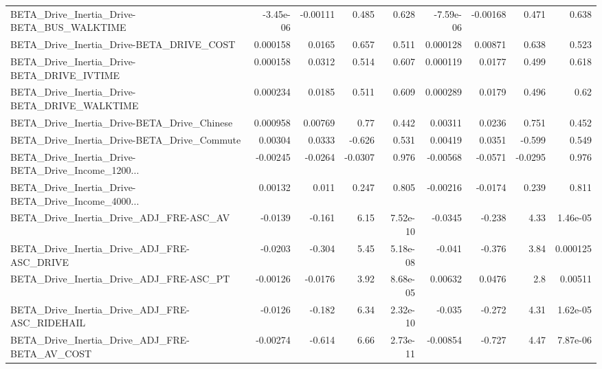 \begin{tabular}{lrrrrrrrr}
BETA\_Drive\_Inertia\_Drive-BETA\_BUS\_WALKTIME         &   -3.45e-06 &     -0.00111 &    0.485 &    0.628 &  -7.59e-06 &    -0.00168 &        0.471 &         0.638 \\
BETA\_Drive\_Inertia\_Drive-BETA\_DRIVE\_COST           &    0.000158 &       0.0165 &    0.657 &    0.511 &   0.000128 &     0.00871 &        0.638 &         0.523 \\
BETA\_Drive\_Inertia\_Drive-BETA\_DRIVE\_IVTIME         &    0.000158 &       0.0312 &    0.514 &    0.607 &   0.000119 &      0.0177 &        0.499 &         0.618 \\
BETA\_Drive\_Inertia\_Drive-BETA\_DRIVE\_WALKTIME       &    0.000234 &       0.0185 &    0.511 &    0.609 &   0.000289 &      0.0179 &        0.496 &          0.62 \\
BETA\_Drive\_Inertia\_Drive-BETA\_Drive\_Chinese        &    0.000958 &      0.00769 &     0.77 &    0.442 &    0.00311 &      0.0236 &        0.751 &         0.452 \\
BETA\_Drive\_Inertia\_Drive-BETA\_Drive\_Commute        &     0.00304 &       0.0333 &   -0.626 &    0.531 &    0.00419 &      0.0351 &       -0.599 &         0.549 \\
BETA\_Drive\_Inertia\_Drive-BETA\_Drive\_Income\_1200... &    -0.00245 &      -0.0264 &  -0.0307 &    0.976 &   -0.00568 &     -0.0571 &      -0.0295 &         0.976 \\
BETA\_Drive\_Inertia\_Drive-BETA\_Drive\_Income\_4000... &     0.00132 &        0.011 &    0.247 &    0.805 &   -0.00216 &     -0.0174 &        0.239 &         0.811 \\
BETA\_Drive\_Inertia\_Drive\_ADJ\_FRE-ASC\_AV            &     -0.0139 &       -0.161 &     6.15 & 7.52e-10 &    -0.0345 &      -0.238 &         4.33 &      1.46e-05 \\
BETA\_Drive\_Inertia\_Drive\_ADJ\_FRE-ASC\_DRIVE         &     -0.0203 &       -0.304 &     5.45 & 5.18e-08 &     -0.041 &      -0.376 &         3.84 &      0.000125 \\
BETA\_Drive\_Inertia\_Drive\_ADJ\_FRE-ASC\_PT            &    -0.00126 &      -0.0176 &     3.92 & 8.68e-05 &    0.00632 &      0.0476 &          2.8 &       0.00511 \\
BETA\_Drive\_Inertia\_Drive\_ADJ\_FRE-ASC\_RIDEHAIL      &     -0.0126 &       -0.182 &     6.34 & 2.32e-10 &     -0.035 &      -0.272 &         4.31 &      1.62e-05 \\
BETA\_Drive\_Inertia\_Drive\_ADJ\_FRE-BETA\_AV\_COST      &    -0.00274 &       -0.614 &     6.66 & 2.73e-11 &   -0.00854 &      -0.727 &         4.47 &      7.87e-06 \\

\end{tabular}
